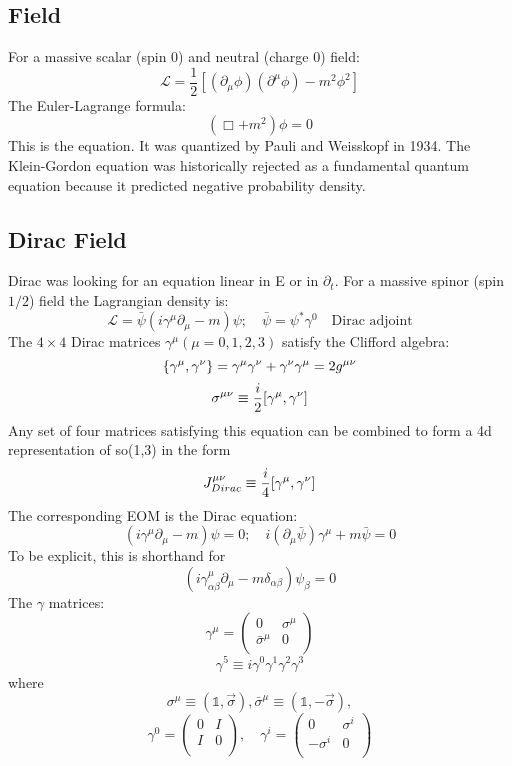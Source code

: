 \subsection{\KG{} Field}
For a massive scalar (spin 0) and neutral (charge 0) field:
$$\mathcal{L} = \frac{1}{2} [(\partial_{\mu}\phi)(\partial^{\mu}\phi) -
m^{2} \phi^{2}]$$
The Euler-Lagrange formula:
$$ (\Box + m^{2})\phi = 0$$
This is the \KG{} equation. It was quantized by Pauli and Weisskopf in 1934.
The Klein-Gordon equation was historically rejected as a fundamental quantum
equation because it predicted negative probability density.

\subsection{Dirac Field}
Dirac was looking for an equation linear in E or in $\partial_t$. For a
massive spinor (spin $1/2$) field the Lagrangian density is:
$$ \mathcal{L} = \bar{\psi}(i\gamma^{\mu}\partial_{\mu} - m)\psi; \quad
\bar{\psi} = \psi^{*}\gamma^{0} \quad \text{Dirac adjoint} $$
The $4 \times 4$ Dirac matrices $\gamma^{\mu} (\mu = 0,1,2,3)$ satisfy the
Clifford algebra:
\[ \{\gamma^{\mu},\gamma^{\nu}\}=\gamma^{\mu}\gamma^{\nu}+\gamma^{\nu}\gamma^{\mu}=2g^{\mu\nu} \]
\[
    \sigma^{\mu\nu} \equiv \frac{i}{2}[\gamma^{\mu}, \gamma^{\nu}]
    \]
Any set of four matrices satisfying this equation can be combined to form a
4d representation of so(1,3) in the form
\[
    J^{\mu\nu}_{Dirac} \equiv \frac{i}{4}[\gamma^\mu, \gamma^\nu]
    \]
The corresponding EOM is the Dirac equation:
$$ (i\gamma^{\mu}\partial_{\mu} - m) \psi =0;	\quad
i(\partial_{\mu}\bar{\psi})\gamma^{\mu} + m\bar{\psi} = 0$$
To be explicit, this is shorthand for
\[
    (i\gamma^\mu_{\alpha\beta}\partial_\mu-m\delta_{\alpha\beta})\psi_\beta = 0
    \]
The $\gamma$ matrices:
\[
    \gamma^{\mu} = 
    \begin{pmatrix}
	0   & \sigma^{\mu}  \\
	\bar{\sigma}^{\mu}  & 0	\\
    \end{pmatrix}
\]
\[
    \gamma^5\equiv{i}\gamma^0\gamma^1\gamma^2\gamma^3
    \]
where
\[
    \sigma^\mu\equiv(\mathds{1},\vec{\sigma}),
    \bar{\sigma}^\mu\equiv(\mathds{1},-\vec{\sigma}),
\]
\[ \gamma^{0} = 
    \begin{pmatrix}
	0   & I	\\
	I   & 0	\\	
    \end{pmatrix}, \quad
    \gamma^{i} = 
    \begin{pmatrix}
	0   & \sigma^{i}    \\
	-\sigma^{i} & 0	    \\
    \end{pmatrix}
\]
